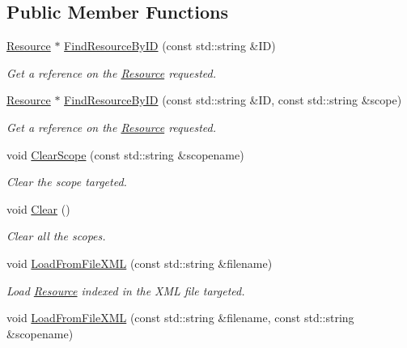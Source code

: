 \subsection*{Public Member Functions}
\begin{DoxyCompactItemize}
\item 
\mbox{\hyperlink{classsfmlbe_1_1_resource}{Resource}} $\ast$ \mbox{\hyperlink{classsfmlbe_1_1_resource_manager_aea559b11d248db65d6bff0caf902098a}{Find\+Resource\+By\+ID}} (const std\+::string \&ID)
\begin{DoxyCompactList}\small\item\em Get a reference on the \mbox{\hyperlink{classsfmlbe_1_1_resource}{Resource}} requested. \end{DoxyCompactList}\item 
\mbox{\hyperlink{classsfmlbe_1_1_resource}{Resource}} $\ast$ \mbox{\hyperlink{classsfmlbe_1_1_resource_manager_a7aa9e19b0a5d525a92ac698ad6497487}{Find\+Resource\+By\+ID}} (const std\+::string \&ID, const std\+::string \&scope)
\begin{DoxyCompactList}\small\item\em Get a reference on the \mbox{\hyperlink{classsfmlbe_1_1_resource}{Resource}} requested. \end{DoxyCompactList}\item 
void \mbox{\hyperlink{classsfmlbe_1_1_resource_manager_a2d25aeeab0779847e3c010ab89c50d0f}{Clear\+Scope}} (const std\+::string \&scopename)
\begin{DoxyCompactList}\small\item\em Clear the scope targeted. \end{DoxyCompactList}\item 
void \mbox{\hyperlink{classsfmlbe_1_1_resource_manager_ae7496b805297eef8c8315ab2437c008c}{Clear}} ()
\begin{DoxyCompactList}\small\item\em Clear all the scopes. \end{DoxyCompactList}\item 
void \mbox{\hyperlink{classsfmlbe_1_1_resource_manager_a8f99da24868d355227f641dc50db2bd2}{Load\+From\+File\+X\+ML}} (const std\+::string \&filename)
\begin{DoxyCompactList}\small\item\em Load \mbox{\hyperlink{classsfmlbe_1_1_resource}{Resource}} indexed in the X\+ML file targeted. \end{DoxyCompactList}\item 
void \mbox{\hyperlink{classsfmlbe_1_1_resource_manager_a2da403b4057837350f5e09f0a33b80dd}{Load\+From\+File\+X\+ML}} (const std\+::string \&filename, const std\+::string \&scopename)

\end{DoxyCompactItemize}
